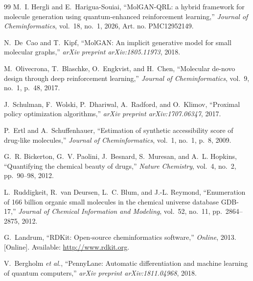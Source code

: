 \documentclass[10pt,twocolumn,a4paper]{article}
\begin{document}
\begin{thebibliography}{99}
\sloppy
{}
M.~I. Hergli and E.~Harigua-Souiai, ``MolGAN-QRL: a hybrid framework for molecule generation using quantum-enhanced reinforcement learning,'' \textit{Journal of Cheminformatics}, vol.~18, no.~1, 2026, Art. no. PMC12952149.

N.~De~Cao and T.~Kipf, ``MolGAN: An implicit generative model for small molecular graphs,'' \textit{arXiv preprint arXiv:1805.11973}, 2018.

M.~Olivecrona, T.~Blaschke, O.~Engkvist, and H.~Chen, ``Molecular de-novo design through deep reinforcement learning,'' \textit{Journal of Cheminformatics}, vol.~9, no.~1, p.~48, 2017.

J.~Schulman, F.~Wolski, P.~Dhariwal, A.~Radford, and O.~Klimov, ``Proximal policy optimization algorithms,'' \textit{arXiv preprint arXiv:1707.06347}, 2017.

P.~Ertl and A.~Schuffenhauer, ``Estimation of synthetic accessibility score of drug-like molecules,'' \textit{Journal of Cheminformatics}, vol.~1, no.~1, p.~8, 2009.

G.~R. Bickerton, G.~V. Paolini, J.~Besnard, S.~Muresan, and A.~L. Hopkins, ``Quantifying the chemical beauty of drugs,'' \textit{Nature Chemistry}, vol.~4, no.~2, pp.~90--98, 2012.

L.~Ruddigkeit, R.~van Deursen, L.~C. Blum, and J.-L. Reymond, ``Enumeration of 166 billion organic small molecules in the chemical universe database GDB-17,'' \textit{Journal of Chemical Information and Modeling}, vol.~52, no.~11, pp.~2864--2875, 2012.

G.~Landrum, ``RDKit: Open-source cheminformatics software,'' \textit{Online}, 2013. [Online]. Available: \url{http://www.rdkit.org}.

V.~Bergholm \textit{et al.}, ``PennyLane: Automatic differentiation and machine learning of quantum computers,'' \textit{arXiv preprint arXiv:1811.04968}, 2018.

\end{thebibliography}
\end{document}
